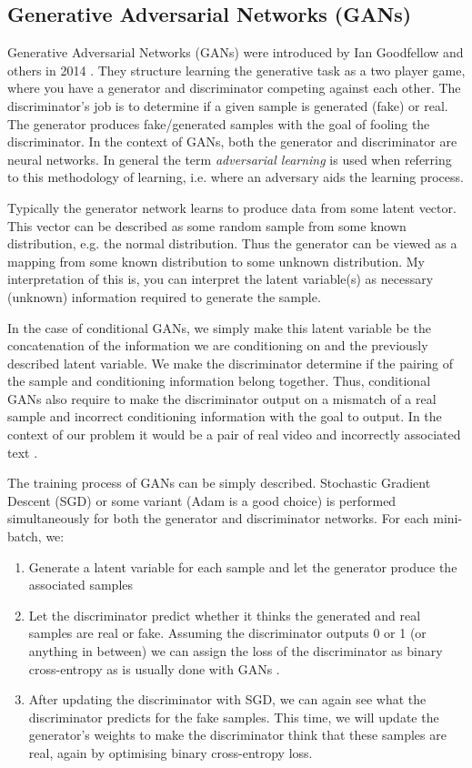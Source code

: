 \documentclass{article}
\begin{document}
\subsection{Generative Adversarial Networks (GANs)}

Generative Adversarial Networks (GANs) were introduced by Ian Goodfellow and others
in 2014 \cite{goodfellow_generative_2014}. They structure learning the
generative task as a two player game, where you have a generator and
discriminator competing against each other. The discriminator's job is to
determine if a given sample is generated (fake) or real. The generator produces
fake/generated samples with the goal of fooling the discriminator. In the
context of GANs, both the generator and discriminator are neural networks. In
general the term \textit{adversarial learning} is used when referring to this
methodology of learning, i.e. where an adversary aids the learning process.

Typically the generator network learns to produce data from some latent
vector. This vector can be described as some random sample from some known
distribution, e.g. the normal distribution. Thus the generator can be viewed as a mapping from some known distribution to some unknown distribution. My
interpretation of this is, you can interpret the latent variable(s) as necessary
(unknown) information required to generate the sample. 

In the case of conditional GANs, we simply make this latent variable be the concatenation of
the information we are conditioning on and the previously described latent
variable. We make the discriminator determine if the pairing of the sample and conditioning information
belong together. Thus, conditional GANs also require to make the discriminator output on a mismatch of a real sample and incorrect conditioning information with the goal to output. In the context of our problem it would be a pair of real video and incorrectly associated text \cite{li_video_2017,pan_create_2018}.

The training process of GANs can be simply described. Stochastic Gradient
Descent (SGD) or some variant (Adam \cite{kingma_adam:_2014} is a good choice) 
is performed simultaneously for both the generator and discriminator networks. For each mini-batch, we: 

\begin{enumerate}
    \item Generate a latent variable for each sample and let the generator
        produce the associated samples
    \item Let the discriminator predict whether it thinks the generated
        and real samples are real or fake. Assuming the discriminator
        outputs 0 or 1 (or anything in between) we can assign the loss of the
        discriminator as binary cross-entropy as is usually done with GANs \cite{goodfellow_nips_2016}.
    \item After updating the discriminator with SGD, we can again see what the discriminator predicts 
          for the fake samples. This time, we will update the generator's weights to make the discriminator think
          that these samples are real, again by optimising binary cross-entropy loss.
\end{enumerate}
\end{document}
